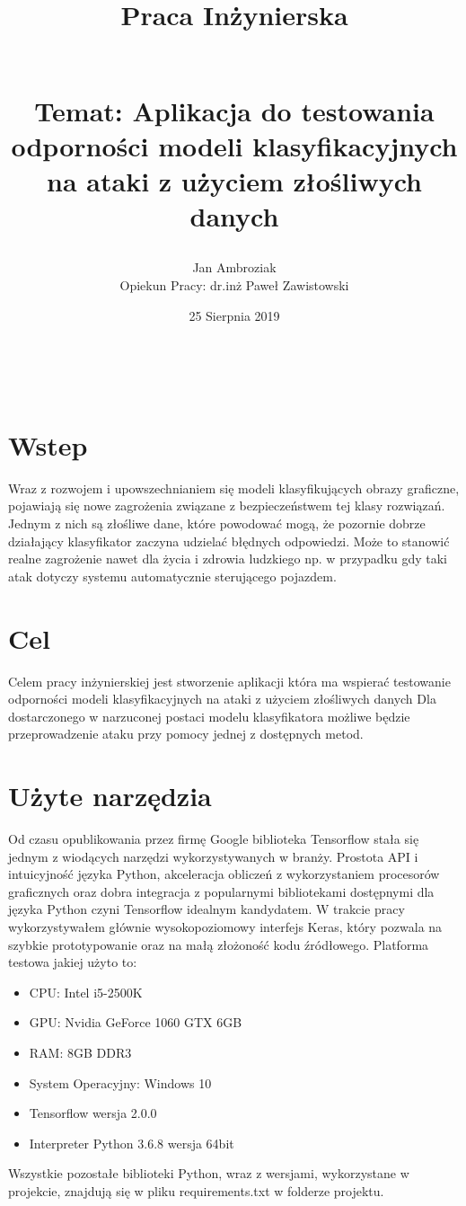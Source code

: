 \documentclass{article}
\title{
Praca Inżynierska
\begin{large}
\\Temat: Aplikacja do testowania odporności
modeli klasyfikacyjnych na ataki z użyciem złośliwych danych
\end{large}}
\date{25 Sierpnia 2019}
\author{Jan Ambroziak \\ Opiekun Pracy: dr.inż Paweł Zawistowski}
\begin{document}
\maketitle

\

\section{Wstep}
Wraz z rozwojem i upowszechnianiem się modeli klasyfikujących obrazy graficzne,
pojawiają się nowe zagrożenia związane z bezpieczeństwem tej klasy rozwiązań.
Jednym z nich są złośliwe dane, które powodować mogą,
że pozornie dobrze działający klasyfikator zaczyna udzielać błędnych odpowiedzi.
Może to stanowić realne zagrożenie nawet dla życia i zdrowia ludzkiego
np. w przypadku gdy taki atak dotyczy systemu automatycznie sterującego pojazdem.

\section{Cel}
\label{sec:target}
Celem pracy inżynierskiej jest stworzenie aplikacji która ma wspierać testowanie
odporności modeli klasyfikacyjnych na ataki z użyciem złośliwych danych
Dla dostarczonego w narzuconej postaci modelu klasyfikatora możliwe będzie
przeprowadzenie ataku przy pomocy jednej z dostępnych metod.

\section{Użyte narzędzia}
Od czasu opublikowania przez firmę Google biblioteka Tensorflow 
stała się jednym z wiodących narzędzi wykorzystywanych w branży. Prostota API i intuicyjność
języka Python, akceleracja obliczeń z wykorzystaniem procesorów graficznych oraz dobra integracja z
popularnymi bibliotekami dostępnymi dla języka Python czyni Tensorflow idealnym kandydatem.
W trakcie pracy wykorzystywałem głównie wysokopoziomowy interfejs Keras, który pozwala na szybkie
prototypowanie oraz na małą złożoność kodu źródłowego.
Platforma testowa jakiej użyto to:
\begin{itemize}
    \item CPU: Intel i5-2500K
    \item GPU: Nvidia GeForce 1060 GTX 6GB
    \item RAM: 8GB DDR3
    \item System Operacyjny: Windows 10
    \item Tensorflow wersja 2.0.0
    \item Interpreter Python 3.6.8 wersja 64bit
\end{itemize}
Wszystkie pozostałe biblioteki Python, wraz z wersjami, wykorzystane w projekcie, znajdują się w pliku
requirements.txt w folderze projektu.
\end{document}
